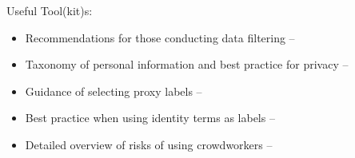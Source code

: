 \noindent Useful Tool(kit)s: 
\begin{itemize}
    \item Recommendations for those conducting data filtering -- \citet{hong_whos_2024}
    \item Taxonomy of personal information and best practice for privacy -- \citet{subramani_detecting_2023}
    \item Guidance of selecting proxy labels -- \citet{guerdan_groundless_2023}
    \item Best practice when using identity terms as labels -- \citet{larson_gender_2017}
    \item Detailed overview of risks of using crowdworkers -- \citet{shmueli_beyond_2021}
\end{itemize}